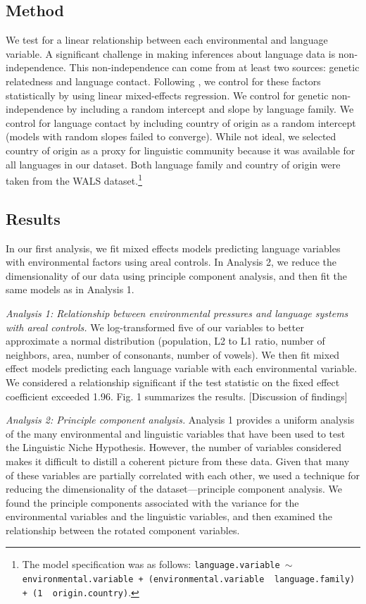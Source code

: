 \documentclass[10pt,letterpaper]{article}
\begin{document}
\subsection{Method}
We test for a linear relationship between each environmental and language variable.  A significant challenge in making inferences about language data is non-independence. This non-independence can come from at least two sources: genetic relatedness and language contact. Following , we control for these factors statistically by using linear mixed-effects regression. We control for genetic non-independence by including a random intercept and slope by language family. We control for language contact by including country of origin as a random intercept (models with random slopes failed to converge). While not ideal, we selected country of origin as a proxy for linguistic community because it  was available for all languages in our dataset. Both language family and country of origin were taken from the WALS dataset.\footnote{The model specification was as follows:  \texttt{language.variable $\sim$ environmental.variable + (environmental.variable~\textbar~language.family) +  (1~\textbar~origin.country)}.} 

\subsection{Results}
In our first analysis, we fit mixed effects models predicting language variables with environmental factors using areal controls. In Analysis 2, we reduce the dimensionality of our data using principle component analysis, and then fit the same models as in Analysis 1.

{\it Analysis 1: Relationship between environmental pressures and language systems with areal controls.}
We  log-transformed five of our variables to better approximate a normal distribution (population, L2 to L1 ratio,  number of neighbors, area, number of consonants, number of vowels). We then fit mixed effect models predicting each language variable with each environmental variable. We considered a relationship significant if the test statistic on the fixed effect coefficient exceeded 1.96. Fig. 1 summarizes the results.
[Discussion of findings]

{\it Analysis 2: Principle component analysis.} 
Analysis 1 provides a uniform analysis of the many environmental and linguistic variables that have been used to test the Linguistic Niche Hypothesis. However,  the number of variables considered makes it difficult to distill a coherent picture from these data. Given that many of these variables  are partially correlated with each other, we used a technique for reducing the dimensionality of the dataset---principle component analysis. We found the principle components associated with the variance for the environmental variables and the linguistic variables, and then examined the relationship between the rotated component variables.
\end{document}
